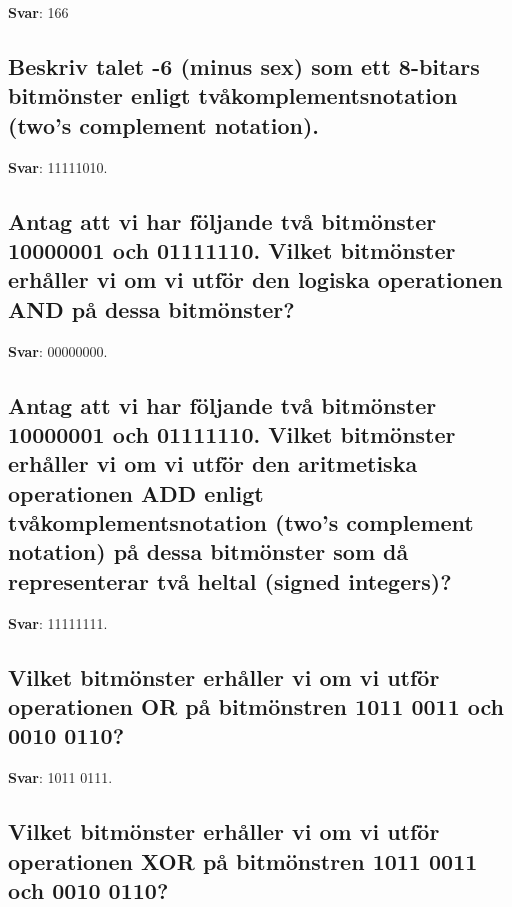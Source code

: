\documentclass[a4paper,11pt,oneside]{article}
\begin{document}
\begin{sloppypar}
\label{q:401:sa:sv:True}

\textbf{Svar}: 166



\subsection{Beskriv talet -6 (minus sex) som ett 8-bitars bitm\"onster enligt tv\r{a}komplementsnotation (two{\textquoteright}s complement notation).}

\label{q:402:sa:sv:True}

\textbf{Svar}: 11111010.



\subsection{Antag att vi har f\"oljande tv\r{a} bitm\"onster 10000001 och 01111110. Vilket bitm\"onster erh\r{a}ller vi om vi utf\"or den logiska operationen AND p\r{a} dessa bitm\"onster?}

\label{q:403:sa:sv:True}

\textbf{Svar}: 00000000.



\subsection{Antag att vi har f\"oljande tv\r{a} bitm\"onster 10000001 och 01111110. Vilket bitm\"onster erh\r{a}ller vi om vi utf\"or den aritmetiska operationen ADD enligt tv\r{a}komplementsnotation (two{\textquoteright}s complement notation) p\r{a} dessa bitm\"onster som d\r{a} representerar tv\r{a} heltal (signed integers)?}

\label{q:404:sa:sv:True}

\textbf{Svar}: 11111111.



\subsection{Vilket bitm\"onster erh\r{a}ller vi om vi utf\"or operationen OR p\r{a} bitm\"onstren 1011 0011 och 0010 0110?}

\label{q:405:sa:sv:True}

\textbf{Svar}: 1011 0111.



\subsection{Vilket bitm\"onster erh\r{a}ller vi om vi utf\"or operationen XOR p\r{a} bitm\"onstren 1011 0011 och 0010 0110?}


\end{sloppypar}
\end{document}
